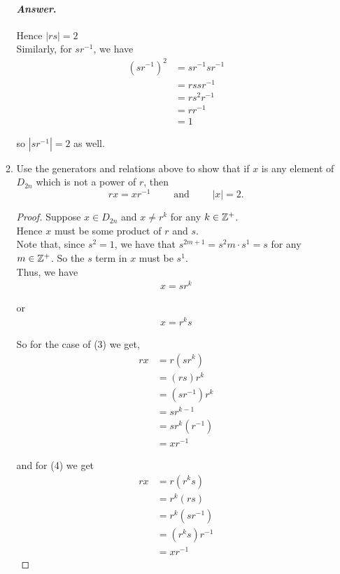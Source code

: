 \documentclass[11pt, reqno]{amsart}
\theoremstyle{plain}
\theoremstyle{definition}
\theoremstyle{example}
\newenvironment{ans}{\color{black}\medskip \paragraph*{\emph{Answer}.}}{\hfill \break  $~\!\!$ \dotfill \medskip }
\begin{document}
\begin{enumerate}[1.]
\begin{enumerate}
\begin{ans}
Hence $|rs| = 2$\\

Similarly, for $sr^{-1}$, we have
\begin{align*}
(sr^{-1})^2 &= sr^{-1}sr^{-1}\\
&= rssr^{-1}\\
&= rs^2r^{-1}\\
&= rr^{-1}\\
&= 1
\end{align*}

so $|sr^{-1}| = 2$ as well.
\end{ans}

\item Use the generators and relations above to show that if $x$ is any element of $D_{2n}$ which is not a power of $r$, then 
	$$rx = xr^{-1} \qquad \text{ and } \qquad |x| = 2.$$
	
\begin{proof}
Suppose $x \in D_{2n}$ and $x \neq r^k$ for any $k \in \mathbb{Z}^+$.\\

Hence $x$ must be some product of $r$ and $s$.\\

Note that, since $s^2 = 1$, we have that $s^{2m+1} = s^2m \cdot s^1 = s$ for any $m \in \mathbb{Z}^+$. So the $s$ term in $x$ must be $s^1$.\\

Thus, we have
\begin{align}
x = sr^k
\end{align}

or 
\begin{align}
x = r^ks
\end{align}

So for the case of (3) we get,
\begin{align*}
rx &= r(sr^k)\\
&= (rs)r^k\\
&= (sr^{-1})r^k\\
&= sr^{k-1}\\
&= sr^k(r^{-1})\\
&= xr^{-1}
\end{align*}

and for (4) we get
\begin{align*}
rx &= r(r^ks)\\
&= r^k(rs)\\
&= r^k(sr^{-1})\\
&= (r^ks)r^{-1}\\
&= xr^{-1}
\end{align*}


\end{proof}
\end{enumerate}
\end{enumerate}
\end{document}
